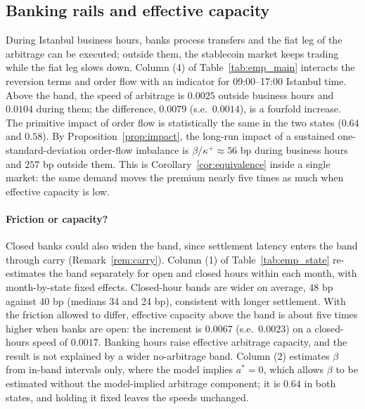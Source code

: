 \documentclass[12pt]{article}
\theoremstyle{definition}
\theoremstyle{remark}
\begin{document}
\subsection{Banking rails and effective capacity}

During Istanbul business hours, banks process transfers and the fiat leg of the arbitrage can be executed; outside them, the stablecoin market keeps trading while the fiat leg slows down. Column (4) of Table~\ref{tab:emp_main} interacts the reversion terms and order flow with an indicator for 09:00--17:00 Istanbul time. Above the band, the speed of arbitrage is $0.0025$ outside business hours and $0.0104$ during them; the difference, $0.0079$ (s.e.\ $0.0014$), is a fourfold increase. The primitive impact of order flow is statistically the same in the two states ($0.64$ and $0.58$). By Proposition~\ref{prop:impact}, the long-run impact of a sustained one-standard-deviation order-flow imbalance is $\beta/\kappa^+\approx 56$ bp during business hours and $257$ bp outside them. This is Corollary~\ref{cor:equivalence} inside a single market: the same demand moves the premium nearly five times as much when effective capacity is low.

\paragraph{Friction or capacity?} Closed banks could also widen the band, since settlement latency enters the band through carry (Remark~\ref{rem:carry}). Column (1) of Table~\ref{tab:emp_state} re-estimates the band separately for open and closed hours within each month, with month-by-state fixed effects. Closed-hour bands are wider on average, 48 bp against 40 bp (medians 34 and 24 bp), consistent with longer settlement. With the friction allowed to differ, effective capacity above the band is about five times higher when banks are open: the increment is $0.0067$ (s.e.\ $0.0023$) on a closed-hours speed of $0.0017$. Banking hours raise effective arbitrage capacity, and the result is not explained by a wider no-arbitrage band. Column (2) estimates $\beta$ from in-band intervals only, where the model implies $a^*=0$, which allows $\beta$ to be estimated without the model-implied arbitrage component; it is $0.64$ in both states, and holding it fixed leaves the speeds unchanged.
\end{document}
